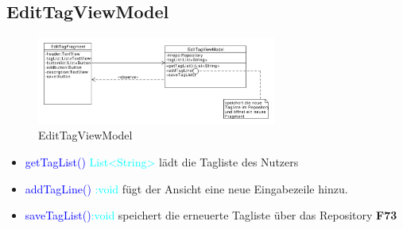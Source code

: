 \subsection{EditTagViewModel}
\begin{figure}[H]
	\centering
	\includegraphics[width=0.7\textwidth]{pics/viewModel/Edit_Tag_ViewModel.pdf}%
	\caption{EditTagViewModel}%
	\label{viewModel}%
\end{figure}
\begin{itemize}
	\item \textcolor{blue}{getTagList()} \textcolor{cyan}{List<String>} lädt die Tagliste des Nutzers
	\item \textcolor{blue}{addTagLine()} \textcolor{cyan}{:void} fügt der Ansicht eine neue Eingabezeile hinzu.
	\item  \textcolor{blue}{saveTagList()}\textcolor{cyan}{:void} speichert die erneuerte Tagliste über das Repository \textbf{F73}
\end{itemize}


